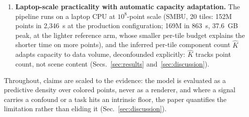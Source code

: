 \begin{enumerate}
  negative log-density (NLPD) ranks held-out error better than random
  on real LiDAR but is outranked by a model-free local-density
  control, so we read the signal as a compact, calibrated,
  density-faithful surrogate, not as ranking power beyond sampling
  density. Null-calibrated per-cell change detection, with a capacity
  dose--response, holds the null that a same-grid classical
  DEM-of-difference (DoD) baseline badly violates. In re-flight
  planning, posterior uncertainty matches a per-tile error oracle and
  out-plans a mass-only control where per-tile recoverable mass is
  comparable; where it is not, mass dominates and the attribution is
  stated.
\item \textbf{Laptop-scale practicality with automatic capacity adaptation.}
  The pipeline runs on a laptop CPU at $10^{8}$-point scale (SMBU, 20
  tiles: 152M points in 2{,}346~s at the production configuration;
  169M in 863~s, 37.6~GB peak, at the lighter reference arm, whose
  smaller per-tile budget explains the shorter time on more points),
  and the inferred per-tile
  component count $\hat{K}$ adapts capacity to data
  volume, deconfounded explicitly: $\hat{K}$ tracks point count, not
  scene content (Secs.~\ref{sec:results}
  and~\ref{sec:discussion}).
\end{enumerate}

 Throughout, claims are scaled to the evidence: the model is evaluated
as a predictive density over colored points, never as a renderer, and
where a signal carries a confound or a task hits an intrinsic floor,
the paper quantifies the limitation rather than eliding it
(Sec.~\ref{sec:discussion}).
